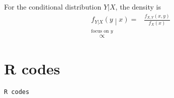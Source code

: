 \documentclass[a4paper,12pt]{article}
\begin{document}
For the conditional distribution $Y|X$, the density is
\[
  \begin{aligned}
    f_{Y|X}\left(y\middle|x\right)
    =& \frac{
      f_{X, Y}\left(x, y\right)
    }{
      f_X\left(x\right)
    }    \\
    \overset{\text{focus on } y}{\propto} &
  \end{aligned}
\]




\clearpage
\appendix

\section{R codes}
\begin{verbatim}
R codes
\end{verbatim}
\end{document}
